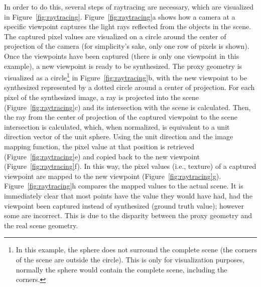 In order to do this, several steps of raytracing are necessary, which are visualized in Figure~\ref{fig:raytracing}. Figure~\ref{fig:raytracing}a shows how a camera at a specific viewpoint captures the light rays reflected from the objects in the scene. The captured pixel values are visualized on a circle around the center of projection of the camera (for simplicity's sake, only one row of pixels is shown).
Once the viewpoints have been captured (there is only one viewpoint in this example), a new viewpoint is ready to be synthesized. The proxy geometry is visualized as a circle\footnote{In this example, the sphere does not surround the complete scene (the corners of the scene are outside the circle). This is only for visualization purposes, normally the sphere would contain the complete scene, including the corners.} in Figure~\ref{fig:raytracing}b, with the new viewpoint to be synthesized represented by a dotted circle around a center of projection. For each pixel of the synthesized image, a ray is projected into the scene (Figure~\ref{fig:raytracing}c) and its intersection with the scene is calculated. Then, the ray from the center of projection of the captured viewpoint to the scene intersection is calculated, which, when normalized, is equivalent to a unit direction vector of the unit sphere. Using the unit direction and the image mapping function, the pixel value at that position is retrieved (Figure~\ref{fig:raytracing}e) and copied back to the new viewpoint (Figure~\ref{fig:raytracing}f).
In this way, the pixel values (i.e., texture) of a captured viewpoint are mapped to the new viewpoint (Figure~\ref{fig:raytracing}g). Figure~\ref{fig:raytracing}h compares the mapped values to the actual scene. It is immediately clear that most points have the value they would have had, had the viewpoint been captured instead of synthesized (ground truth value); however some are incorrect. This is due to the disparity between the proxy geometry and the real scene geometry.

